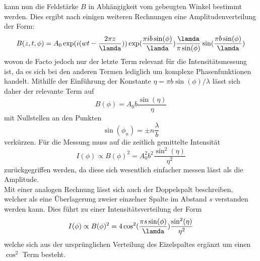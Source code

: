kann nun die Feldstärke $B$ in Abhängigkeit vom gebeugten Winkel bestimmt werden. Dies ergibt nach einigen weiteren Rechnungen eine 
Amplitudenverteilung der Form:
\begin{equation}
B(z,t,\phi)=A_0\exp(i(wt-\frac{2\pi z}{\lamda}))\exp(\frac{\pi ib\sin(\phi)}{\lamda})\frac{\lamda}{\pi \sin(\phi)}\sin(\frac{\pi b\sin(\phi)}{\lamda})
\end{equation}
wovon de Facto jedoch nur der letzte Term relevant für die Intensitätsmessung ist, da es sich bei den anderen
Termen lediglich um komplexe Phasenfunktionen handelt. Mithilfe der Einführung der Konstante $\eta=\pi b\sin(\phi)/\lambda$
lässt sich daher der relevante Term auf 
\begin{equation}
B(\phi)=A_0b\frac{\sin(\eta)}{\eta}
\end{equation}
mit Nullstellen an den Punkten
\begin{equation}
\sin(\phi_n)=\pm n\frac{\lambda}{b}
\end{equation}
verkürzen. Für die Messung muss auf die zeitlich gemittelte Intensität
\begin{equation}
    \label{eq:einfachspalt}
I(\phi)\propto B(\phi)^2=A_0^2b^2\frac{\sin^2(\eta)}{\eta^2}
\end{equation}
zurückgegriffen werden, da diese sich wesentlich einfacher messen lässt als die Amplitude. \\
Mit einer analogen Rechnung lässt sich auch der Doppelspalt beschreiben, welcher als eine Überlagerung zweier einzelner Spalte im Abstand $s$ verstanden
werden kann. Dies führt zu einer Intensitätsverteilung der Form
\begin{equation}
    \label{eq:doppelspalt}
I(\phi)\propto B(\phi)^2=4\cos^2(\frac{\pi s\sin(\phi)}{\lamda})\frac{\sin^2(\eta)}{\eta^2}
\end{equation}
welche sich aus der ursprünglichen Verteilung des Eizelspaltes ergänzt um einen $\cos^2$ Term besteht.


